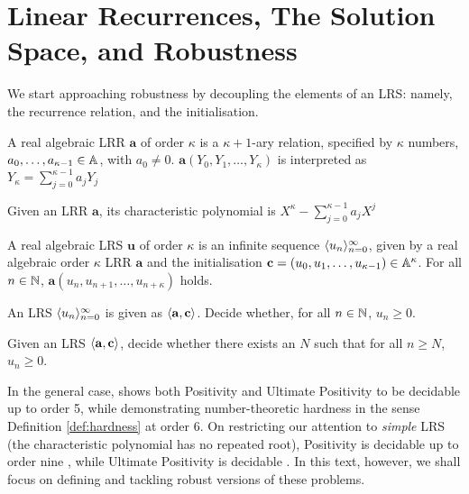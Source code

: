\section{Linear Recurrences, The Solution Space, and Robustness}
\label{section:solspace}

We start approaching robustness by decoupling the elements of an LRS: namely, the recurrence relation, and the initialisation.

\begin{definition}
\label{def:LRR}
A real algebraic LRR $\mathbf{a}$ of order $\kappa$ is a $\kappa+1$-ary relation, specified by $\kappa$ numbers, $a_0, \dots, a_{\kappa-1} \in \mathbb{A}$, with $a_0 \ne 0$. $\mathbf{a}(Y_0, Y_1, \dots, Y_\kappa)$ is interpreted as 
$
Y_\kappa = \sum_{j=0}^{\kappa-1} a_j Y_j
$
\end{definition}

\begin{definition}
\label{def:charpoly}
Given an LRR $\mathbf{a}$, its characteristic polynomial is
$
X^{\kappa} - \sum_{j=0}^{\kappa-1}a_j X^j
$
\end{definition}

\begin{definition}
\label{def:LRS}
A real algebraic LRS $\mathbf{u}$ of order $\kappa$ is an infinite sequence $\langle u_n\rangle_{n=0}^\infty$, given by a real algebraic order $\kappa$ LRR $\mathbf{a}$ and the initialisation $\mathbf{c} = (u_0, u_1, \dots, u_{\kappa-1}) \in \mathbb{A}^\kappa$. For all $n \in \mathbb{N}$, $\mathbf{a}(u_n, u_{n+1}, \dots, u_{n+\kappa})$ holds.
\end{definition}

\begin{problem}[Positivity]
\label{prob:pos}
An LRS $\langle u_n\rangle_{n=0}^\infty$ is given as $\langle\mathbf{a}, \mathbf{c}\rangle$. Decide whether, for all $n \in \mathbb{N}$, $u_n \ge 0$.
\end{problem}

\begin{problem}
\label{prob:ultpos}
Given an LRS $\langle\mathbf{a}, \mathbf{c}\rangle$, decide whether there exists an $N$ such that for all $n \ge N$, $u_n \ge 0$.
\end{problem}

In the general case, \cite{joeljames3} shows both Positivity and Ultimate Positivity to be decidable up to order 5, while demonstrating number-theoretic hardness in the sense Definition \ref{def:hardness} at order $6$. On restricting our attention to \textit{simple} LRS (the characteristic polynomial has no repeated root), Positivity is decidable up to order nine \cite{ouaknine2014positivity}, while Ultimate Positivity is decidable \cite{ouaknine2014ultimate}. In this text, however, we shall focus on defining and tackling robust versions of these problems.

